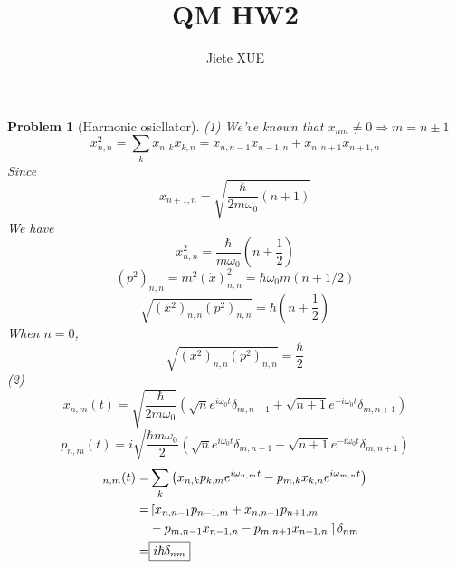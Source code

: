 \documentclass{article}
\title{\textbf{QM HW2}}
\author{Jiete XUE}
\date{\mydate}
\theoremstyle{t}
\newtheorem{problem}{Problem}
\begin{document}
\maketitle
\begin{problem}[Harmonic osicllator]
(1) We've known that $x_{nm}\not=0\Rightarrow m=n\pm1$
\begin{equation}
    x_{n,n}^2=\sum_{k}x_{n,k}x_{k,n}=x_{n, n-1}x_{n-1,n}+x_{n, n+1}x_{n+1,n}
\end{equation}
Since
\begin{equation}
    x_{n+1,n}=\sqrt{\frac{\hbar}{2m\omega_0}(n+1)}
\end{equation}
We have 
\begin{equation}
    \boxed{x_{n,n}^2=\frac{\hbar}{m\omega_0}\left(n+\frac{1}{2}\right)}
\end{equation}
\begin{equation}
        (p^2)_{n,n}=m^2 (\dot{x})_{n,n}^{2} =\hbar \omega_0m (n + 1/2) 
\end{equation}
\begin{equation}
    \boxed{\sqrt{(x^2)_{n,n}(p^2)_{n,n}}=\hbar\left(n+\frac{1}{2}\right)}
\end{equation}
When $n=0$,
\begin{equation}
   \sqrt{(x^2)_{n,n}(p^2)_{n,n}}=\frac{\hbar}{2} 
\end{equation}
(2) 
\begin{equation}
    \boxed{x_{n,m}(t)=\sqrt{\frac{\hbar}{2m\omega_0}}\left(\sqrt{n}e^{i\omega_0t}\delta_{m,n-1}+\sqrt{n+1}e^{-i\omega_0t}\delta_{m,n+1}\right)}
\end{equation}
\begin{equation}
    \boxed{p_{n,m}(t)=i\sqrt{\frac{\hbar m\omega_0}{2}}\left(\sqrt{n}e^{i\omega_0t}\delta_{m,n-1}-\sqrt{n+1}e^{-i\omega_0 t}\delta_{m,n+1}\right)}
\end{equation}
\begin{align}
    [x,p]_{n,m}(t)=&\sum_{k}\left(x_{n,k}p_{k,m}e^{i\omega_{n,m}t}-p_{m,k}x_{k,n}e^{i\omega_{m,n}t}\right)\\
   =&\left[x_{n,n-1}p_{n-1,m}+x_{n,n+1}p_{n+1,m}\right.\notag\\
   &-p_{m,n-1}x_{n-1,n}-p_{m,n+1}x_{n+1,n}\left.\right]\delta_{nm}\\
   =& \boxed{i\hbar\delta_{nm}}
\end{align}
\end{problem}
\end{document}
